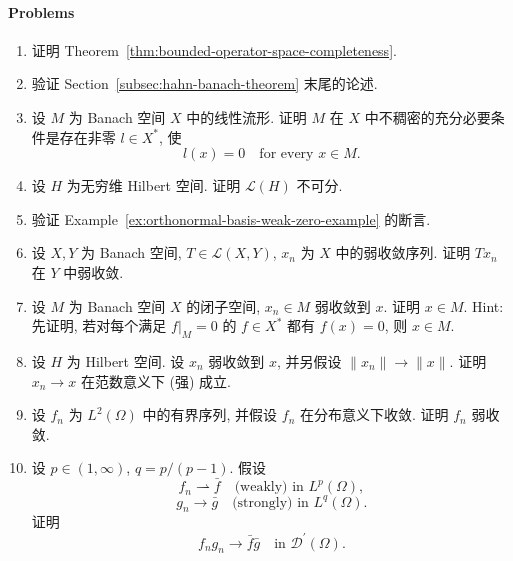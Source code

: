 \paragraph*{Problems}

\begin{enumerate}[label=\thesection.\arabic*.,ref=\thesection.\arabic*,start=24,series=book-problems]

\item\label{ex:bounded-operator-space-completeness} 证明 Theorem~\ref{thm:bounded-operator-space-completeness}.

\item\label{ex:hahn-banach-hilbert-extension-details} 验证 Section~\ref{subsec:hahn-banach-theorem} 末尾的论述.

\item\label{ex:nondense-linear-manifold-annihilating-functional} 设 $M$ 为 Banach 空间 $X$ 中的线性流形. 证明 $M$ 在 $X$ 中不稠密的充分必要条件是存在非零 $l\in X^*$, 使\[l(x)=0\quad\text{for every }x\in M.\]

\item\label{ex:infinite-hilbert-operator-space-nonseparable} 设 $H$ 为无穷维 Hilbert 空间. 证明 $\mathcal{L}(H)$ 不可分.

\item\label{ex:orthonormal-basis-weak-zero} 验证 Example~\ref{ex:orthonormal-basis-weak-zero-example} 的断言.

\item\label{ex:bounded-linear-map-weak-continuity} 设 $X,Y$ 为 Banach 空间, $T\in\mathcal{L}(X,Y)$, $x_n$ 为 $X$ 中的弱收敛序列. 证明 $Tx_n$ 在 $Y$ 中弱收敛.

\item\label{ex:closed-linear-subspace-weak-sequential-closure} 设 $M$ 为 Banach 空间 $X$ 的闭子空间, $x_n\in M$ 弱收敛到 $x$. 证明 $x\in M$. Hint: 先证明, 若对每个满足 $f|_M=0$ 的 $f\in X^*$ 都有 $f(x)=0$, 则 $x\in M$.

\item\label{ex:hilbert-weak-convergence-and-norms-imply-strong} 设 $H$ 为 Hilbert 空间. 设 $x_n$ 弱收敛到 $x$, 并另假设 $\|x_n\|\to\|x\|$. 证明 $x_n\to x$ 在范数意义下 (强) 成立.

\item\label{ex:bounded-l-two-distribution-limit-is-weak-limit} 设 $f_n$ 为 $L^2(\Omega)$ 中的有界序列, 并假设 $f_n$ 在分布意义下收敛. 证明 $f_n$ 弱收敛.

\item\label{ex:weak-strong-holder-dual-product-distribution-limit} 设 $p\in(1,\infty)$, $q=p/(p-1)$. 假设\[f_n\rightharpoonup\bar f\quad\text{(weakly) in }L^p(\Omega),\]\[g_n\to\bar g\quad\text{(strongly) in }L^q(\Omega).\]证明\[f_ng_n\to\bar f\bar g\quad\text{in }\mathcal{D}^{\prime}(\Omega).\]


\end{enumerate}
